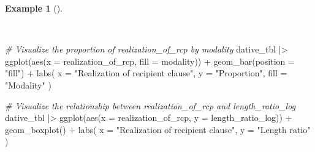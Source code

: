 \documentclass[
  letterpaper,
]{latex/krantz}
\newenvironment{Shaded}{\begin{snugshade}}{\end{snugshade}}
\newcommand{\AttributeTok}[1]{\textcolor[rgb]{0.00,0.00,0.00}{#1}}
\newcommand{\CommentTok}[1]{\textcolor[rgb]{0.00,0.00,0.00}{\textit{#1}}}
\newcommand{\FunctionTok}[1]{\textcolor[rgb]{0.00,0.00,0.00}{#1}}
\newcommand{\NormalTok}[1]{\textcolor[rgb]{0.00,0.00,0.00}{#1}}
\newcommand{\SpecialCharTok}[1]{\textcolor[rgb]{0.00,0.00,0.00}{#1}}
\newcommand{\StringTok}[1]{\textcolor[rgb]{0.00,0.00,0.00}{#1}}
\theoremstyle{definition}
\newtheorem{example}{Example}[chapter]
\theoremstyle{remark}
\begin{document}
\begin{example}[]\protect\hypertarget{exm-ida-cat-bivariate-vis-length-ratio-log}{}\label{exm-ida-cat-bivariate-vis-length-ratio-log}

~

\begin{Shaded}
\begin{Highlighting}[]
\CommentTok{\# Visualize the proportion of \textasciigrave{}realization\_of\_rcp\textasciigrave{} by \textasciigrave{}modality\textasciigrave{}}
\NormalTok{dative\_tbl }\SpecialCharTok{|\textgreater{}}
  \FunctionTok{ggplot}\NormalTok{(}\FunctionTok{aes}\NormalTok{(}\AttributeTok{x =}\NormalTok{ realization\_of\_rcp, }\AttributeTok{fill =}\NormalTok{ modality)) }\SpecialCharTok{+}
  \FunctionTok{geom\_bar}\NormalTok{(}\AttributeTok{position =} \StringTok{"fill"}\NormalTok{) }\SpecialCharTok{+}
  \FunctionTok{labs}\NormalTok{(}
    \AttributeTok{x =} \StringTok{"Realization of recipient clause"}\NormalTok{,}
    \AttributeTok{y =} \StringTok{"Proportion"}\NormalTok{,}
    \AttributeTok{fill =} \StringTok{"Modality"}
\NormalTok{  )}

\CommentTok{\# Visualize the relationship between \textasciigrave{}realization\_of\_rcp\textasciigrave{} and \textasciigrave{}length\_ratio\_log\textasciigrave{}}
\NormalTok{dative\_tbl }\SpecialCharTok{|\textgreater{}}
  \FunctionTok{ggplot}\NormalTok{(}\FunctionTok{aes}\NormalTok{(}\AttributeTok{x =}\NormalTok{ realization\_of\_rcp, }\AttributeTok{y =}\NormalTok{ length\_ratio\_log)) }\SpecialCharTok{+}
  \FunctionTok{geom\_boxplot}\NormalTok{() }\SpecialCharTok{+}
  \FunctionTok{labs}\NormalTok{(}
    \AttributeTok{x =} \StringTok{"Realization of recipient clause"}\NormalTok{,}
    \AttributeTok{y =} \StringTok{"Length ratio"}
\NormalTok{  )}
\end{Highlighting}
\end{Shaded}

\begin{figure}[H]

\begin{minipage}{0.50\linewidth}

\centering{

}
\end{minipage}
\end{figure}
\end{example}
\end{document}
